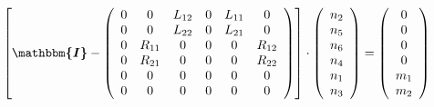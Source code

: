 \[ \left[ \boldsymbol{\mathbbm{I}}  - \left(\begin{array}{cccccc} 0 &
0 & L_{12} & 0 & L_{11} & 0 \\ 0 & 0 & L_{22} & 0 & L_{21} & 0 \\ 0 &
R_{11} & 0 & 0 & 0 & R_{12} \\ 0 & R_{21} & 0 & 0 & 0 & R_{22} \\ 0 &
0 & 0 & 0 & 0 & 0 \\ 0 & 0 & 0 & 0 & 0 & 0 \end{array}\right)\right]
\cdot \left(\begin{array}{c} n_{2} \\ n_{5} \\ n_{6} \\ n_{4} \\ n_{1}
\\ n_{3} \end{array}\right) = \left(\begin{array}{c} 0 \\ 0 \\ 0 \\ 0
\\ m_{1} \\ m_{2} \end{array}\right) \]
